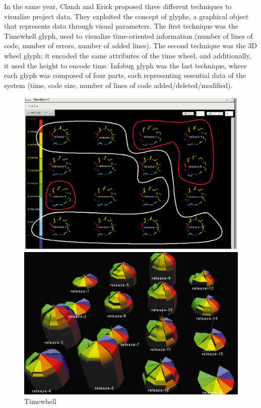 \newpage
In the same year, Chuah and Erick \cite{Chuah1998} proposed three different techniques to visualize project data. They exploited the concept of glyphs, a graphical object that represents data through visual parameters. The first technique was the Timewhell glyph, used to visualize time-oriented information (number of lines of code, number of errors, number of added lines). The second technique was the 3D wheel glyph; it encoded the same attributes of the time wheel, and additionally, it used the height to encode time. Infobug glyph was the last technique, where each glyph was composed of four parts, each representing essential data of the system (time, code size, number of lines of code added/deleted/modified). \newline

\begin{figure}[H]
  \includegraphics[width=\linewidth]{Chuan1.png}
  \caption{Timewhell}
\endminipage\hfill
{}
  \includegraphics[width=\linewidth]{Chuan2.png}

\end{figure}
